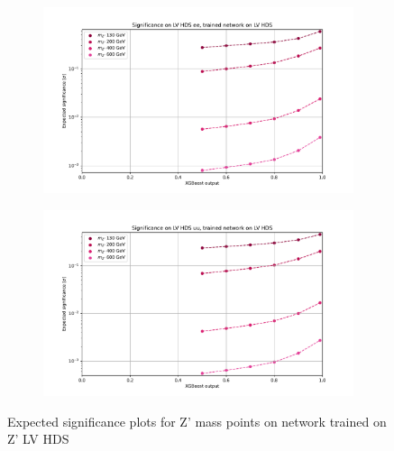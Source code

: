 \documentclass[12pt, a4paper]{book}
\begin{document}
\begin{figure}[!ht]
	\centering
	\begin{subfigure}[b]{0.49\textwidth}
      \centering
      \includegraphics[width=1\textwidth]{XGBoost/LV_HDS/EXP_SIG_ee.pdf}
      \end{subfigure}
   \hfill
   \begin{subfigure}[b]{0.49\textwidth}
      \centering
      \includegraphics[width=1\textwidth]{XGBoost/LV_HDS/EXP_SIG_uu.pdf}
      \end{subfigure}
   \caption{Expected significance plots for Z' mass points on network trained on Z' LV HDS}\label{fig:LV_HDS_exp_sig}
\end{figure}
\end{document}
